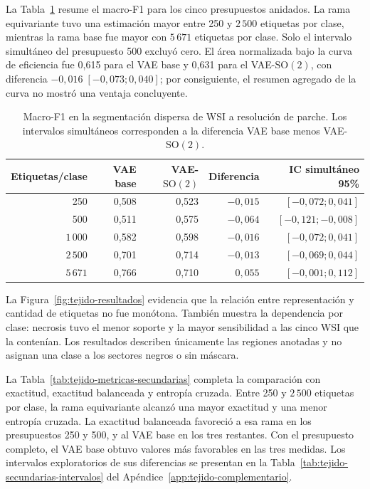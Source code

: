 La Tabla~\ref{tab:eficiencia-etiquetas} resume el macro-F1 para los cinco
presupuestos anidados. La rama equivariante tuvo una estimación mayor entre 250
y \(2\,500\) etiquetas por clase, mientras la rama base fue mayor con
\(5\,671\) etiquetas por clase. Solo el intervalo simultáneo del presupuesto 500
excluyó cero. El área normalizada bajo la curva de eficiencia fue 0,615 para el
VAE base y 0,631 para el VAE-\(\mathrm{SO}(2)\), con diferencia
\(-0,016\;[-0,073;0,040]\); por consiguiente, el resumen agregado de la curva
no mostró una ventaja concluyente.

\begin{table}[htbp]
    \centering
    \caption{Macro-F1 en la segmentación dispersa de WSI a resolución de
    parche. Los intervalos simultáneos corresponden a la diferencia VAE base
    menos VAE-\(\mathrm{SO}(2)\).}
    \label{tab:eficiencia-etiquetas}
    \small
    \begin{tabular}{@{}rrrrr@{}}
        \toprule
        Etiquetas/clase & VAE base & VAE-\(\mathrm{SO}(2)\) & Diferencia & IC simultáneo 95\% \\
        \midrule
        250 & 0,508 & 0,523 & \(-0,015\) & \([-0,072;0,041]\) \\
        500 & 0,511 & 0,575 & \(-0,064\) & \([-0,121;-0,008]\) \\
        \(1\,000\) & 0,582 & 0,598 & \(-0,016\) & \([-0,072;0,041]\) \\
        \(2\,500\) & 0,701 & 0,714 & \(-0,013\) & \([-0,069;0,044]\) \\
        \(5\,671\) & 0,766 & 0,710 & \(0,055\) & \([-0,001;0,112]\) \\
        \bottomrule
    \end{tabular}
\end{table}

La Figura~\ref{fig:tejido-resultados} evidencia que la relación entre
representación y cantidad de etiquetas no fue monótona. También muestra la
dependencia por clase: necrosis tuvo el menor soporte y la mayor sensibilidad a
las cinco WSI que la contenían. Los resultados describen únicamente las
regiones anotadas y no asignan una clase a los sectores negros o sin máscara.

La Tabla~\ref{tab:tejido-metricas-secundarias} completa la comparación con
exactitud, exactitud balanceada y entropía cruzada. Entre 250 y
\(2\,500\) etiquetas por clase, la rama equivariante alcanzó una mayor
exactitud y una menor entropía cruzada. La exactitud balanceada favoreció a
esa rama en los presupuestos 250 y 500, y al VAE base en los tres restantes.
Con el presupuesto completo, el VAE base obtuvo valores más favorables en
las tres medidas. Los intervalos exploratorios de sus diferencias se
presentan en la Tabla~\ref{tab:tejido-secundarias-intervalos} del
Apéndice~\ref{app:tejido-complementario}.

